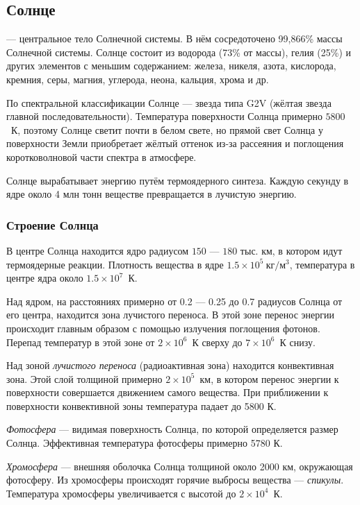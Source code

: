 \subsection{Солнце}
 --- центральное тело Солнечной системы. В нём сосредоточено 99,866\%  массы Солнечной системы. Солнце состоит из водорода (73\% от массы), гелия (25\%) и других элементов с меньшим содержанием: железа, никеля, азота, кислорода, кремния, серы, магния, углерода, неона, кальция, хрома и др.

По спектральной классификации Солнце --- звезда типа G2V (жёлтая звезда главной последовательности). Температура поверхности Солнца  примерно $5 800$~К, поэтому Солнце светит почти в белом свете, но прямой свет Солнца у поверхности Земли приобретает жёлтый оттенок из-за рассеяния и поглощения коротковолновой части спектра в атмосфере.

Солнце вырабатывает энергию путём термоядерного синтеза. Каждую секунду в ядре около 4 млн тонн веществе превращается в лучистую энергию.

\subsubsection*{Строение Солнца}

В центре Солнца находится ядро радиусом $150 $ --- $ 180$ тыс. км, в котором идут термоядерные реакции. Плотность  вещества в ядре $1.5\times 10^5~\text{кг}/\text{м}^3$, температура в центре ядра около $1.5\times 10^7$~К.

Над ядром, на расстояниях примерно от 0.2 --- 0.25 до 0.7 радиусов Солнца от его центра, находится зона лучистого переноса. В этой зоне перенос энергии происходит главным образом с помощью  излучения поглощения фотонов. Перепад температур в этой зоне от $2\times10^6$~К сверху до $7\times10^6$~К снизу.

Над зоной \textit{лучистого  переноса} (радиоактивная зона) находится конвективная зона. Этой слой толщиной примерно $2\times10^5$~км, в котором перенос энергии к поверхности совершается движением самого вещества. При приближении к поверхности конвективной зоны температура падает до 5800 К.

\textit{Фотосфера} --- видимая поверхность Солнца, по которой определяется размер Солнца. Эффективная температура фотосферы примерно 5780 К.

\textit{Хромосфера} --- внешняя оболочка Солнца толщиной около 2000 км, окружающая фотосферу. Из хромосферы происходят горячие  выбросы вещества --- \textit{спикулы}. Температура хромосферы увеличивается с высотой до $2\times10^4$~К.

